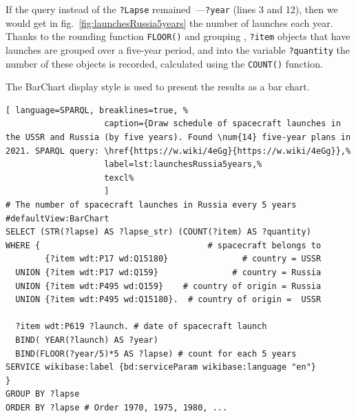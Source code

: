 If the query instead of the \lstinline|?Lapse| remained~---\lstinline|?year| (lines 3 and 12),
then we would get in fig.~\ref{fig:launchesRussia5years}
the number of launches each year.
Thanks to the rounding function \lstinline|FLOOR()|
and grouping%
,
\lstinline|?item| objects that have launches are grouped over a five-year period,
and into the variable \lstinline|?quantity| the number of these objects is recorded,
calculated using the \lstinline|COUNT()| function.

The BarChart display style is used to present the results as a bar chart.

\begin{lstlisting}[ language=SPARQL, breaklines=true, %
                    caption={Draw schedule of spacecraft launches in the USSR and Russia (by five years). Found \num{14} five-year plans in 2021. SPARQL query: \href{https://w.wiki/4eGg}{https://w.wiki/4eGg}},%
                    label=lst:launchesRussia5years,%
                    texcl%
                    ]
# The number of spacecraft launches in Russia every 5 years
#defaultView:BarChart
SELECT (STR(?lapse) AS ?lapse_str) (COUNT(?item) AS ?quantity)
WHERE {                                  # spacecraft belongs to
        {?item wdt:P17 wd:Q15180}               # country = USSR
  UNION {?item wdt:P17 wd:Q159}               # country = Russia
  UNION {?item wdt:P495 wd:Q159}    # country of origin = Russia
  UNION {?item wdt:P495 wd:Q15180}.  # country of origin =  USSR
  
  ?item wdt:P619 ?launch. # date of spacecraft launch
  BIND( YEAR(?launch) AS ?year) 
  BIND(FLOOR(?year/5)*5 AS ?lapse) # count for each 5 years
SERVICE wikibase:label {bd:serviceParam wikibase:language "en"}
} 
GROUP BY ?lapse
ORDER BY ?lapse # Order 1970, 1975, 1980, ...
\end{lstlisting}%

